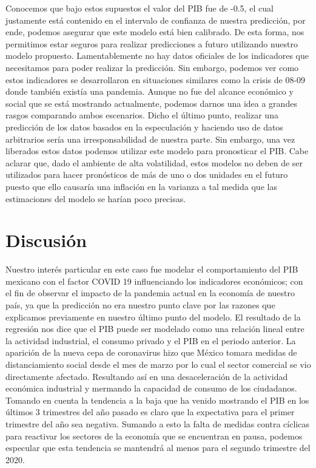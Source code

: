 \documentclass[a4paper]{article}
\begin{document}
Conocemos que bajo estos supuestos el valor del PIB fue de -0.5, el cual justamente está contenido en el intervalo de confianza de nuestra predicción, por ende, podemos asegurar que este modelo está bien calibrado.  De esta forma, nos permitimos estar seguros para realizar predicciones a futuro utilizando nuestro modelo propuesto.
\newline
Lamentablemente no hay datos oficiales de los indicadores que necesitamos para poder realizar la predicción. Sin embargo, podemos ver como estos indicadores se desarrollaron en situaciones similares como la crisis de 08-09 donde también existía una pandemia. Aunque no fue del alcance económico y social que se está mostrando actualmente, podemos darnos una idea a grandes rasgos comparando ambos escenarios.
\newline
\newline
Dicho el último punto, realizar una predicción de los datos basados en la especulación y haciendo uso de datos arbitrarios sería una irresponsabilidad de nuestra parte. Sin embargo, una vez liberados estos datos podemos utilizar este modelo para pronosticar el PIB. 
\newline
Cabe aclarar que, dado el ambiente de alta volatilidad, estos modelos no deben de ser utilizados para hacer pronósticos de más de uno o dos unidades en el futuro puesto que ello causaría una inflación en la varianza a tal medida que las estimaciones del modelo se harían poco precisas.

\section{Discusión}

Nuestro interés particular en este caso fue modelar el comportamiento del PIB mexicano con el factor COVID 19 influenciando los indicadores económicos; con el fin de observar el impacto de la pandemia actual en la economía de nuestro país, ya que la predicción no era nuestro punto clave por las razones que explicamos previamente en nuestro último punto del modelo. 
\newline
\newline
El resultado de la regresión nos dice que el PIB puede ser modelado como una relación lineal entre la actividad industrial, el consumo privado y el PIB en el periodo anterior.
\newline
\newline
La aparición de la nueva cepa de coronavirus hizo que México tomara medidas de distanciamiento social desde el mes de marzo por lo cual el sector comercial se vio directamente afectado. Resultando así en una desaceleración de la actividad económica industrial y mermando la capacidad de consumo de los ciudadanos. 
\newline
\newline
Tomando en cuenta la tendencia a la baja que ha venido mostrando el PIB en los últimos 3 trimestres del año pasado es claro que la expectativa para el primer trimestre del año sea negativa. Sumando a esto la falta de medidas contra cíclicas para reactivar los sectores de la economía que se encuentran en pausa, podemos especular que esta tendencia se mantendrá al menos para el segundo trimestre del 2020.
\end{document}
